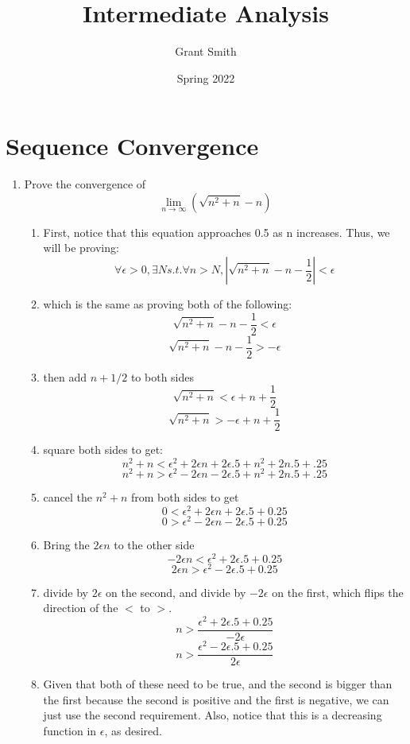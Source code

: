 \documentclass{article}
\title{Intermediate Analysis}
\author{Grant Smith }
\date{Spring 2022}
\begin{document}
\maketitle

\section{Sequence Convergence}

\begin{enumerate}
    \item Prove the convergence of $$\lim_{n\rightarrow \infty} (\sqrt{n^{2}+n}-n)$$
    \begin{enumerate}
        \item First, notice that this equation approaches 0.5 as n increases.  Thus, we will be proving:
        $$\forall \epsilon > 0,  \exists N s.t. \forall n > N, \left| \sqrt{n^{2}+n}-n - \frac{1}{2}\right| < \epsilon$$
        \item which is the same as proving both of the following:
        $$ \sqrt{n^{2}+n}-n - \frac{1}{2} < \epsilon$$
        $$ \sqrt{n^{2}+n}-n - \frac{1}{2} > -\epsilon$$
        \item then add $n + 1/2$ to both sides
        $$ \sqrt{n^{2}+n} < \epsilon + n + \frac{1}{2}$$
        $$ \sqrt{n^{2}+n} > -\epsilon + n + \frac{1}{2}$$
        \item square both sides to get:
        $$ n^{2}+n < \epsilon^2 + 2\epsilon n + 2 \epsilon .5 + n^2 + 2 n .5 + .25$$
        $$ n^{2}+n > \epsilon^2 - 2\epsilon n - 2 \epsilon .5 + n^2 + 2 n .5 + .25 $$
        \item cancel the $n^{2}+n$ from both sides to get
        $$ 0 < \epsilon^2 + 2\epsilon n + 2 \epsilon .5 + 0 .25$$
        $$ 0 > \epsilon^2 - 2\epsilon n - 2 \epsilon .5 + 0 .25 $$
        \item Bring the $2\epsilon n$ to the other side
        $$ -2\epsilon n < \epsilon^2  + 2 \epsilon .5 + 0 .25$$
        $$ 2 \epsilon n > \epsilon^2  - 2 \epsilon .5 + 0 .25 $$   
        \item divide by $2\epsilon$ on the second, and divide by $-2\epsilon$ on the first, which flips the direction of the $<$ to $>$.
        $$ n > \frac{\epsilon^2  + 2 \epsilon .5 + 0 .25}{-2\epsilon} $$
        $$ n > \frac {\epsilon^2  - 2 \epsilon .5 + 0 .25}{2 \epsilon} $$
        \item Given that both of these need to be true, and the second is bigger than the first because the second is positive and the first is negative, we can just use the second requirement. Also, notice that this is a decreasing function in $\epsilon$, as desired.

\end{enumerate}
\end{enumerate}
\end{document}
